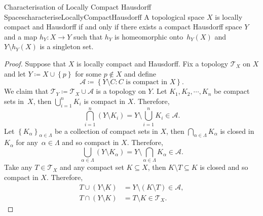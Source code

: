 \documentclass[math]{amznotes}
\theoremstyle{remark}
\begin{document}
\begin{probox}{Characterisation of Locally Compact Hausdorff Spaces}{characteriseLocallyCompactHausdorff}
    A topological space $X$ is locally compact and Hausdorff if and only if there exists a compact Hausdorff space $Y$ and a map $h_Y \colon X \to Y$ such that $h_Y$ is homeomorphic onto~$h_Y\left(X\right)$ and $Y \setminus h_Y\left(X\right)$ is a singleton set.
    \tcblower
    \begin{proof}
        Suppose that $X$ is locally compact and Hausdorff. Fix a topology $\mathcal{T}_X$ on $X$ and let $Y \coloneqq X \cup \left\{p\right\}$ for some $p \notin X$ and define 
        \begin{equation*}
            \mathcal{A} \coloneqq \left\{Y \setminus C \colon C \textrm{ is compact in } X\right\}.
        \end{equation*}
        We claim that $\mathcal{T}_Y \coloneqq \mathcal{T}_X \cup \mathcal{A}$ is a topology on $Y$. Let $K_1, K_2, \cdots, K_n$ be compact sets in~$X$, then $\bigcup_{i = 1}^nK_i$ is compact in $X$. Therefore, 
        \begin{equation*}
            \bigcap_{i = 1}^n\left(Y \setminus K_i\right) = Y \setminus \bigcup_{i = 1}^nK_i \in \mathcal{A}.
        \end{equation*}
        Let $\left\{K_{\alpha}\right\}_{\alpha \in \Lambda}$ be a collection of compact sets in $X$, then $\bigcap_{\alpha \in \Lambda}K_{\alpha}$ is closed in $K_{\alpha}$ for any~$\alpha \in \Lambda$ and so compact in $X$. Therefore, 
        \begin{equation*}
            \bigcup_{\alpha \in \Lambda}\left(Y \setminus K_{\alpha}\right) = Y \setminus \bigcap_{\alpha \in \Lambda}K_{\alpha} \in \mathcal{A}.
        \end{equation*}
        Take any $T \in \mathcal{T}_X$ and any compact set $K \subseteq X$, then $K \setminus T \subseteq K$ is closed and so compact in $X$. Therefore, 
        \begin{align*}
            T \cup \left(Y \setminus K\right) & = Y \setminus \left(K \setminus T\right) \in \mathcal{A}, \\
            T \cap \left(Y \setminus K\right) & = T \setminus K \in \mathcal{T}_X.
        \end{align*}

\end{proof}
\end{probox}
\end{document}
